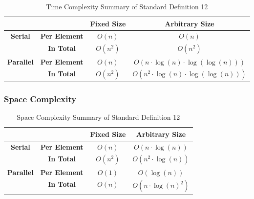 \documentclass[conference]{IEEEtran}
\begin{document}
\renewcommand{\arraystretch}{1.25}
\begin{table}[H]
    \centering
    \caption{Time Complexity Summary of Standard Definition 12}
    \begin{tabular}{|cc|c|c|}
        \hline
        & & \textbf{Fixed Size} & \textbf{Arbitrary Size} \\
        \hline
        \multirow{2}{*}{\textbf{Serial}} \hspace{-5pt} & \textbf{Per Element} & $O(n)$ & $O(n)$ \\
        \cline{2-4}
        & \textbf{In Total} & $O\left(n^2\right)$ & $O\left(n^2\right)$ \\
        \hline
        \multirow{2}{*}{\textbf{Parallel}} \hspace{-5pt} & \textbf{Per Element} & $O(n) $ & $O(n \cdot \log(n) \cdot \log(\log(n)))$ \\
        \cline{2-4}
        & \textbf{In Total} & $O\left(n^2\right) $ & $O\left(n^2 \cdot \log(n) \cdot \log(\log(n))\right)$ \\
        \hline
    \end{tabular}
    \label{tab:time_p2_d12}
\end{table}


\subsubsection{Space Complexity}

\begin{table}[H]
    \centering
    \caption{Space Complexity Summary of Standard Definition 12}
    \begin{tabular}{|cc|c|c|}
        \hline
        & & \textbf{Fixed Size} & \textbf{Arbitrary Size} \\
        \hline
        \multirow{2}{*}{\textbf{Serial}} \hspace{-5pt} & \textbf{Per Element} & $O(n)$ & $O\left(n \cdot \log(n)\right)$ \\
        \cline{2-4}
        & \textbf{In Total} & $O\left(n^2\right)$ & $O\left(n^2 \cdot \log(n)\right)$ \\
        \hline
        \multirow{2}{*}{\textbf{Parallel}} \hspace{-5pt} & \textbf{Per Element} & $O(1)$ & $O\left(\log(n)\right)$ \\
        \cline{2-4}
        & \textbf{In Total} & $O(n)$ & $O\left(n \cdot \log(n)^2\right)$ \\
        \hline
    \end{tabular}
    \label{tab:space_p2_d12}
\end{table}
\renewcommand{\arraystretch}{1}
\end{document}
